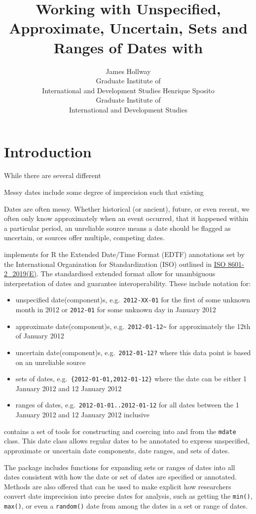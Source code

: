 \documentclass[
]{jss}
\author{
James Hollway\\Graduate Institute of\\
International and Development Studies \And Henrique Sposito\\Graduate
Institute of\\
International and Development Studies
}
\title{Working with Unspecified, Approximate, Uncertain, Sets and Ranges
of Dates with \pkg{messydates}}
\providecommand{\tightlist}{%
  \setlength{\itemsep}{0pt}\setlength{\parskip}{0pt}}
\begin{document}
\hypertarget{introduction}{%
\section{Introduction}\label{introduction}}

While there are several different

Messy dates include some degree of imprecision such that existing

Dates are often messy. Whether historical (or ancient), future, or even
recent, we often only know approximately when an event occurred, that it
happened within a particular period, an unreliable source means a date
should be flagged as uncertain, or sources offer multiple, competing
dates.

 implements for R the Extended Date/Time Format (EDTF)
annotations set by the International Organization for Standardization
(ISO) outlined in \href{https://www.iso.org/standard/70908.html}{ISO
8601-2\_2019(E)}. The standardised extended format allow for unambiguous
interpretation of dates and guarantee interoperability. These include
notation for:

\begin{itemize}
\tightlist
\item
  unspecified date(component)s, e.g.~\texttt{2012-XX-01} for the first
  of some unknown month in 2012 or \texttt{2012-01} for some unknown day
  in January 2012
\item
  approximate date(component)s,
  e.g.~\texttt{2012-01-12\textasciitilde{}} for approximately the 12th
  of January 2012
\item
  uncertain date(component)s, e.g.~\texttt{2012-01-12?} where this data
  point is based on an unreliable source
\item
  sets of dates, e.g.~\texttt{\{2012-01-01,2012-01-12\}} where the date
  can be either 1 January 2012 and 12 January 2012
\item
  ranges of dates, e.g.~\texttt{2012-01-01..2012-01-12} for all dates
  between the 1 January 2012 and 12 January 2012 inclusive
\end{itemize}

 contains a set of tools for constructing and coercing
into and from the \texttt{mdate} class. This date class allows regular
dates to be annotated to express unspecified, approximate or uncertain
date components, date ranges, and sets of dates.

The package includes functions for expanding sets or ranges of dates
into all dates consistent with how the date or set of dates are
specified or annotated. Methods are also offered that can be used to
make explicit how researchers convert date imprecision into precise
dates for analysis, such as getting the \texttt{min()}, \texttt{max()},
or even a \texttt{random()} date from among the dates in a set or range
of dates.
\end{document}
